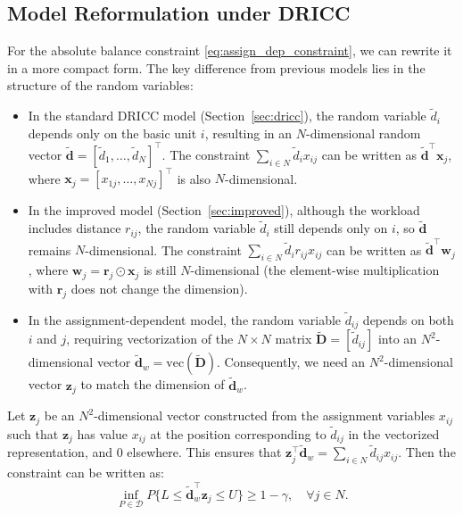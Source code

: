 \documentclass[preprint,12pt,authoryear]{elsarticle}
\begin{document}
\subsection{Model Reformulation under DRICC}

For the absolute balance constraint \eqref{eq:assign_dep_constraint}, we can rewrite it in a more compact form. The key difference from previous models lies in the structure of the random variables:

\begin{itemize}
    \item In the standard DRICC model (Section~\ref{sec:dricc}), the random variable $\tilde{d}_i$ depends only on the basic unit $i$, resulting in an $N$-dimensional random vector $\widetilde{\mathbf{d}} = [\tilde{d}_1, \ldots, \tilde{d}_N]^\top$. The constraint $\sum_{i \in N} \tilde{d}_i x_{ij}$ can be written as $\widetilde{\mathbf{d}}^\top \mathbf{x}_j$, where $\mathbf{x}_j = [x_{1j}, \ldots, x_{Nj}]^\top$ is also $N$-dimensional.

    \item In the improved model (Section~\ref{sec:improved}), although the workload includes distance $r_{ij}$, the random variable $\tilde{d}_i$ still depends only on $i$, so $\widetilde{\mathbf{d}}$ remains $N$-dimensional. The constraint $\sum_{i \in N} \tilde{d}_i r_{ij} x_{ij}$ can be written as $\widetilde{\mathbf{d}}^\top \mathbf{w}_j$, where $\mathbf{w}_j = \mathbf{r}_j \odot \mathbf{x}_j$ is still $N$-dimensional (the element-wise multiplication with $\mathbf{r}_j$ does not change the dimension).

    \item In the assignment-dependent model, the random variable $\tilde{d}_{ij}$ depends on both $i$ and $j$, requiring vectorization of the $N \times N$ matrix $\widetilde{\mathbf{D}} = [\tilde{d}_{ij}]$ into an $N^2$-dimensional vector $\widetilde{\mathbf{d}}_w = \text{vec}(\widetilde{\mathbf{D}})$. Consequently, we need an $N^2$-dimensional vector $\mathbf{z}_j$ to match the dimension of $\widetilde{\mathbf{d}}_w$.
\end{itemize}

Let $\mathbf{z}_j$ be an $N^2$-dimensional vector constructed from the assignment variables $x_{ij}$ such that $\mathbf{z}_j$ has value $x_{ij}$ at the position corresponding to $\tilde{d}_{ij}$ in the vectorized representation, and 0 elsewhere. This ensures that $\mathbf{z}_j^\top \widetilde{\mathbf{d}}_w = \sum_{i \in N} \tilde{d}_{ij} x_{ij}$. Then the constraint can be written as:
\begin{equation}
\inf_{P \in \mathcal{D}} P \{L \leqslant \widetilde{\mathbf{d}}_w^\top \mathbf{z}_j \leqslant U \} \geqslant 1 - \gamma, \quad \forall j \in N. \label{eq:assign_dep_rewritten}
\end{equation}
\end{document}
